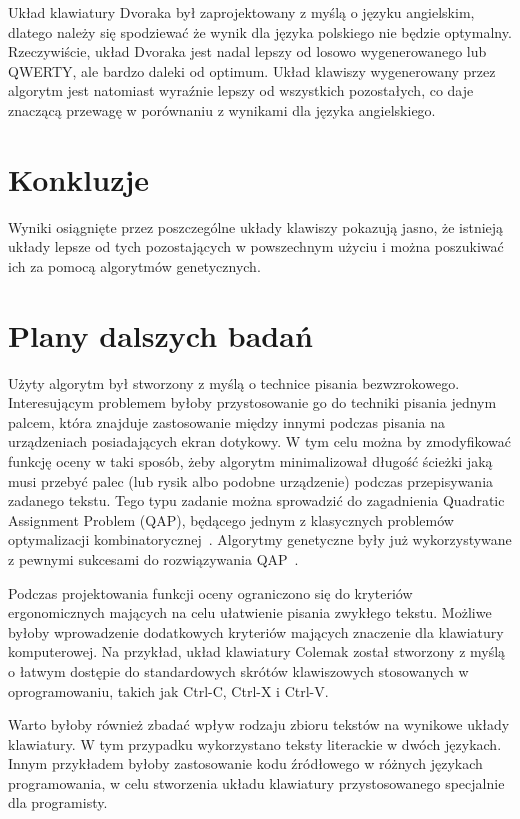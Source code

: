\documentclass[brudnopis]{xmgr}
\begin{document}
Układ klawiatury Dvoraka był zaprojektowany z myślą o języku angielskim, dlatego należy się spodziewać że wynik dla języka polskiego nie będzie optymalny. Rzeczywiście, układ Dvoraka jest nadal lepszy od losowo wygenerowanego lub QWERTY, ale bardzo daleki od optimum. Układ klawiszy wygenerowany przez algorytm jest natomiast wyraźnie lepszy od wszystkich pozostałych, co daje znaczącą przewagę w porównaniu z wynikami dla języka angielskiego.


\summary

\section{Konkluzje}

Wyniki osiągnięte przez poszczególne układy klawiszy pokazują jasno, że istnieją układy lepsze od tych pozostających w powszechnym użyciu i można poszukiwać ich za pomocą algorytmów genetycznych.

\section{Plany dalszych badań}

Użyty algorytm był stworzony z myślą o technice pisania bezwzrokowego. Interesującym problemem byłoby przystosowanie go do techniki pisania jednym palcem, która znajduje zastosowanie między innymi podczas pisania na urządzeniach posiadających ekran dotykowy. W tym celu można by zmodyfikować funkcję oceny w taki sposób, żeby algorytm minimalizował długość ścieżki jaką musi przebyć palec (lub rysik albo podobne urządzenie) podczas przepisywania zadanego tekstu. Tego typu zadanie można sprowadzić do zagadnienia Quadratic Assignment Problem (QAP), będącego jednym z klasycznych problemów optymalizacji kombinatorycznej~\cite{Ji_asolution}. Algorytmy genetyczne były już wykorzystywane z pewnymi sukcesami do rozwiązywania QAP~\cite{Misevicius200465}.

Podczas projektowania funkcji oceny ograniczono się do kryteriów ergonomicznych mających na celu ułatwienie pisania zwykłego tekstu. Możliwe byłoby wprowadzenie dodatkowych kryteriów mających znaczenie dla klawiatury komputerowej. Na przykład, układ klawiatury Colemak został stworzony z myślą o łatwym dostępie do standardowych skrótów klawiszowych stosowanych w oprogramowaniu, takich jak Ctrl-C, Ctrl-X i Ctrl-V.

Warto byłoby również zbadać wpływ rodzaju zbioru tekstów na wynikowe układy klawiatury. W tym przypadku wykorzystano teksty literackie w dwóch językach. Innym przykładem byłoby zastosowanie kodu źródłowego w różnych językach programowania, w celu stworzenia układu klawiatury przystosowanego specjalnie dla programisty.
\end{document}
